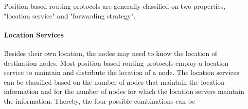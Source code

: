Position-based routing protocols are generally classified on two properties, "location service" and "forwarding strategy".

\paragraph{Location Services}
Besides their own location, the nodes may need to know the location of destination nodes. Most position-based routing protocols employ a location service to maintain and distribute the location of a node. The location services can be classified based on the number of nodes that maintain the location information and for the number of nodes for which the location servers maintain the information. Thereby, the four possible combinations can be \cite{}